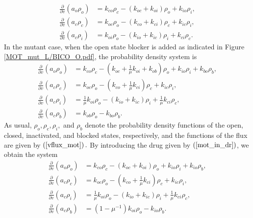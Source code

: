\begin{align}
\frac{\partial}{\partial v}\left(  a_{o}\rho_{o}\right)   &  =k_{co}\rho
_{c}-\left(  k_{oc}+k_{oi}\right)  \rho_{o}+k_{io}\rho_{i},\nonumber\\
\frac{\partial}{\partial v}\left(  a_{c}\rho_{c}\right)   &  =k_{oc}\rho
_{o}-\left(  k_{co}+k_{ci}\right)  \rho_{c}+k_{ic}\rho_{i},\label{wt_mt_in}\\
\frac{\partial}{\partial v}\left(  a_{c}\rho_{i}\right)   &  =k_{oi}\rho
_{o}-(k_{io}+k_{ic})\rho_{i}+k_{ci}\rho_{c}.\nonumber
\end{align}
In the mutant case, when the open state blocker is added as indicated in Figure
\ref{MOT_mut_L/BICO_O.pdf}, the probability density system is%
\begin{align}
\frac{\partial}{\partial v}\left(  a_{o}\rho_{o}\right)   &  =k_{co}\rho
_{c}-\left(  k_{oc}+\frac{1}{\mu}k_{oi}+k_{ob}\right)  \rho_{o}+k_{io}\rho_{i}%
+k_{bo}\rho_{b},\nonumber\\
\frac{\partial}{\partial v}\left(  a_{c}\rho_{c}\right)   &  =k_{oc}\rho
_{o}-\left(  k_{co}+\frac{1}{\mu}k_{ci}\right)  \rho_{c}+k_{ic}\rho
_{i},\label{mot_dr_123}\\
\frac{\partial}{\partial v}\left(  a_{c}\rho_{i}\right)   &  =\frac{1}{\mu
}k_{oi}\rho_{o}-(k_{io}+k_{ic})\rho_{i}+\frac{1}{\mu}k_{ci}\rho_{c}%
,\nonumber\\
\frac{\partial}{\partial v}\left(  a_{c}\rho_{b}\right)   &  =k_{ob}\rho
_{o}-k_{bo}\rho_{b}.\nonumber
\end{align}
As usual, $\rho_{o},\rho_{c},\rho_{i},$ and $\rho_{b}$ denote the probability density
functions of the open, closed, inactivated, and blocked states, respectively,
and the functions of the flux are given by $\left(  \ref{vflux_mot}\right)  .$ By introducing
the drug given by $\left(  \ref{mot_in_dr}\right)  $, we obtain the system
\begin{align}
\frac{\partial}{\partial v}\left(  a_{o}\rho_{o}\right)   &  =k_{co}\rho
_{c}-\left(  k_{oc}+k_{oi}\right)  \rho_{o}+k_{io}\rho_{i}%
+k_{io}\rho_{b},\nonumber\\
\frac{\partial}{\partial v}\left(  a_{c}\rho_{c}\right)   &  =k_{oc}\rho
_{o}-\left(  k_{co}+\frac{1}{\mu}k_{ci}\right)  \rho_{c}+k_{ic}\rho
_{i},\label{mot_dr_124}\\
\frac{\partial}{\partial v}\left(  a_{c}\rho_{i}\right)   &  =\frac{1}{\mu
}k_{oi}\rho_{o}-(k_{io}+k_{ic})\rho_{i}+\frac{1}{\mu}k_{ci}\rho_{c}%
,\nonumber\\
\frac{\partial}{\partial v}\left(  a_{c}\rho_{b}\right)   &  =\left(
1-\mu^{-1}\right)  k_{oi}\rho_{o}-k_{io}\rho_{b}.\nonumber
\end{align}
